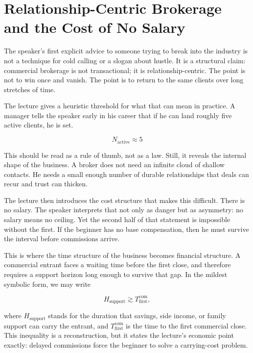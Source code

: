 \section{Relationship-Centric Brokerage and the Cost of No Salary}

The speaker's first explicit advice to someone trying to break into the industry is not a technique for cold calling or a slogan about hustle. It is a structural claim: commercial brokerage is not transactional; it is relationship-centric. The point is not to win once and vanish. The point is to return to the same clients over long stretches of time.

The lecture gives a heuristic threshold for what that can mean in practice. A manager tells the speaker early in his career that if he can land roughly five active clients, he is set.

\begin{equation}
N_{\text{active}} \approx 5
\end{equation}

This should be read as a rule of thumb, not as a law. Still, it reveals the internal shape of the business. A broker does not need an infinite cloud of shallow contacts. He needs a small enough number of durable relationships that deals can recur and trust can thicken.

The lecture then introduces the cost structure that makes this difficult. There is no salary. The speaker interprets that not only as danger but as asymmetry: no salary means no ceiling. Yet the second half of that statement is impossible without the first. If the beginner has no base compensation, then he must survive the interval before commissions arrive.

This is where the time structure of the business becomes financial structure. A commercial entrant faces a waiting time before the first close, and therefore requires a support horizon long enough to survive that gap. In the mildest symbolic form, we may write

\begin{equation}
H_{\text{support}} \gtrsim T_{\text{first}}^{\text{com}},
\end{equation}

where \(H_{\text{support}}\) stands for the duration that savings, side income, or family support can carry the entrant, and \(T_{\text{first}}^{\text{com}}\) is the time to the first commercial close. This inequality is a reconstruction, but it states the lecture's economic point exactly: delayed commissions force the beginner to solve a carrying-cost problem.

